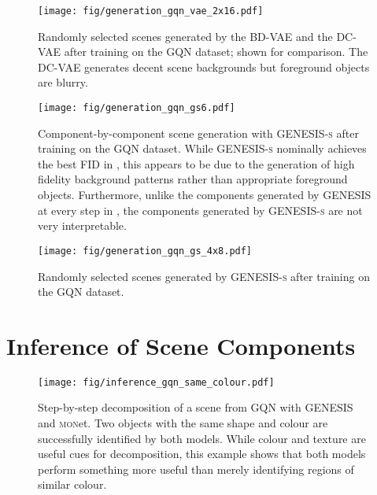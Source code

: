 \documentclass{article}
\begin{document}
\begin{figure}[h]
    \centering
    \texttt{[image: fig/generation\_gqn\_vae\_2x16.pdf]}
    \caption{Randomly selected scenes generated by the BD-VAE and the DC-VAE after training on
the GQN dataset; shown for comparison. The DC-VAE generates decent scene backgrounds but foreground objects are blurry.}
    \label{fig:generation_gqn_vae}
\end{figure}

\begin{figure}[h]
    \centering
    \texttt{[image: fig/generation\_gqn\_gs6.pdf]}
    \caption{Component-by-component scene generation with \gls{GENESIS}\textsc{-s} after training on the GQN dataset. While \gls{GENESIS}\textsc{-s} nominally achieves the best FID in , this appears to be due to the generation of high fidelity background patterns rather than appropriate foreground objects. Furthermore, unlike the components generated by \gls{GENESIS} at every step in , the components generated by \gls{GENESIS}\textsc{-s} are not very interpretable.}
    \label{fig:generation_gqn_gs6}
\end{figure}

\begin{figure}[h]
    \centering
    \texttt{[image: fig/generation\_gqn\_gs\_4x8.pdf]}
    \caption{Randomly selected scenes generated by \gls{GENESIS}\textsc{-s} after training on the GQN dataset.}
    \label{fig:generation_gqn_gs_4x8}
\end{figure}


\clearpage



\section{Inference of Scene Components}
\label{app:scene_decomposition}

\begin{figure}[h]
    \centering
    \texttt{[image: fig/inference\_gqn\_same\_colour.pdf]}
    \caption{Step-by-step decomposition of a scene from GQN with \gls{GENESIS} and \textsc{mon}et. Two objects with the same shape and colour are successfully identified by both models. While colour and texture are useful cues for decomposition, this example shows that both models perform something more useful than merely identifying regions of similar colour.}
    \label{fig:inference_gqn_same_colour}
\end{figure}
\end{document}
